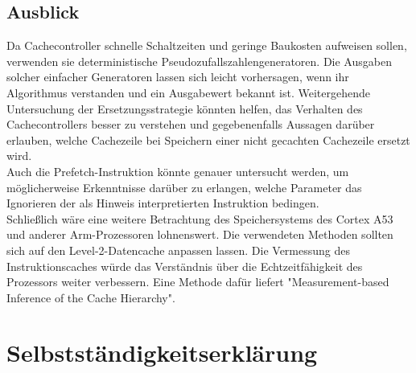 \documentclass[]{scrbook}
\begin{document}
\section{Ausblick}

Da Cachecontroller schnelle Schaltzeiten und geringe Baukosten aufweisen sollen, verwenden sie deterministische Pseudozufallszahlengeneratoren. 
Die Ausgaben solcher einfacher Generatoren lassen sich leicht vorhersagen, wenn ihr Algorithmus verstanden und ein Ausgabewert bekannt ist.
Weitergehende Untersuchung der Ersetzungsstrategie könnten helfen, das Verhalten des Cachecontrollers besser zu verstehen und gegebenenfalls Aussagen darüber erlauben, welche Cachezeile bei Speichern einer nicht gecachten Cachezeile ersetzt wird.
\\
Auch die Prefetch-Instruktion könnte genauer untersucht werden, um möglicherweise Erkenntnisse darüber zu erlangen, welche Parameter das Ignorieren der als Hinweis interpretierten Instruktion bedingen.
\\
Schließlich wäre eine weitere Betrachtung des Speichersystems des Cortex A53 und anderer Arm-Prozessoren lohnenswert.
Die verwendeten Methoden sollten sich auf den Level-2-Datencache anpassen lassen.
Die Vermessung des Instruktionscaches würde das Verständnis über die Echtzeitfähigkeit des Prozessors weiter verbessern. 
Eine Methode dafür liefert "Measurement-based Inference of the Cache Hierarchy". \cite[S.\,54 ff.]{abel_ma}




\printbibliography
{}



\chapter*{Selbstständigkeitserklärung}
\thispagestyle{empty}


\clearpage
\thispagestyle{empty}
\begin{center}
\vfill
\phantom{© \makeatletter\@author\makeatother}
\end{center}
\end{document}
